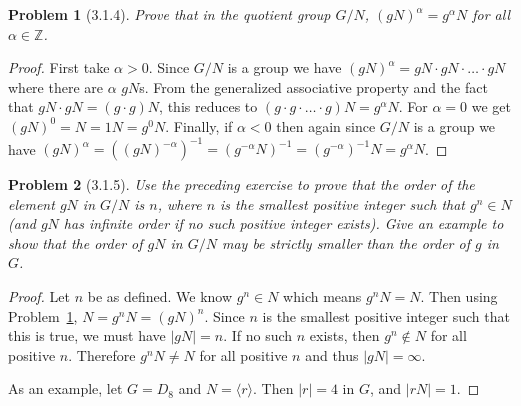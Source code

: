 \documentclass{article}
\newtheorem{problem}{Problem}
\begin{document}

\begin{problem}[3.1.4]
\label{normalpowers}
Prove that in the quotient group $G/N$, $(gN)^{\alpha} = g^{\alpha}N$ for all $\alpha \in \mathbb{Z}$.
\end{problem}
\begin{proof}
First take $\alpha > 0$. Since $G/N$ is a group we have $(gN)^{\alpha} = gN \cdot gN \cdot \dots \cdot gN$ where there are $\alpha$ $gN$s. From the generalized associative property and the fact that $gN \cdot gN = (g \cdot g) N$, this reduces to $(g \cdot g \cdot \dots \cdot g) N = g^{\alpha} N$. For $\alpha = 0$ we get $(gN)^0 = N = 1 N = g^0N$. Finally, if $\alpha < 0$ then again since $G/N$ is a group we have $(gN)^{\alpha} = \left ( (gN)^{-\alpha} \right )^{-1} = (g^{-\alpha}N)^{-1} = (g^{-\alpha})^{-1}N = g^{\alpha}N$.
\end{proof}

\begin{problem}[3.1.5]
Use the preceding exercise to prove that the order of the element $gN$ in $G/N$ is $n$, where $n$ is the smallest positive integer such that $g^n \in N$ (and $gN$ has infinite order if no such positive integer exists). Give an example to show that the order of $gN$ in $G/N$ may be strictly smaller than the order of $g$ in $G$.
\end{problem}
\begin{proof}
Let $n$ be as defined. We know $g^n \in N$ which means $g^n N = N$. Then using Problem~\ref{normalpowers}, $N = g^nN = (gN)^n$. Since $n$ is the smallest positive integer such that this is true, we must have $|gN| = n$. If no such $n$ exists, then $g^n \notin N$ for all positive $n$. Therefore $g^nN \neq N$ for all positive $n$ and thus $|gN| = \infty$.

As an example, let $G = D_8$ and $N = \langle r \rangle$. Then $|r| = 4$ in $G$, and $|rN| = 1$.
\end{proof}
\end{document}
